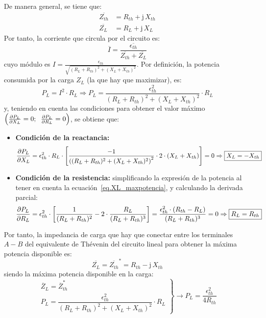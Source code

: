 \documentclass[11pt]{book} %
\begin{document}
De manera general, se tiene que: 
\begin{align*}
  \overline{Z_{th}} &= R_{th} + \mathrm{j}\,X_{th}\\
  \overline{Z_L} &= R_L + \mathrm{j}\,X_L
\end{align*}
Por tanto, la corriente que circula por el circuito es: 
\begin{equation*}
\overline{I} = \frac{\overline{\epsilon_{th}}}{\overline{Z_{th}} + \overline{Z_L}}
\end{equation*}
cuyo módulo es $I=\frac{\epsilon_{th}}{\sqrt{(R_L+R_{th})^2+(X_L+X_{th})^2}}$. Por definición, la potencia consumida por la carga $Z_L$ (la que hay que maximizar), es: 
\begin{equation*}
   P_L= I^2 \cdot R_L\Rightarrow P_L = \dfrac{\epsilon_{th}^2}{{(R_L+R_{th})^2+(X_L+X_{th})^2}} \cdot R_L
\end{equation*}
y, teniendo en cuenta las condiciones para obtener el valor máximo $\left(\diffp{P_L}{X_L} = 0;\;\;    \diffp{P_L}{R_L} = 0\right)$, se obtiene que: 
\begin{itemize}
    \item \textbf{Condición de la reactancia:}
    \begin{equation}\label{eq.XL_maxpotencia}
        \diffp{P_L}{X_L} = \epsilon^2_{th} \cdot R_L \cdot \left[\frac{-1}{\left((R_L + R_{th})^2 + (X_L + X_{th})^2\right)^2} \cdot 2 \cdot (X_L + X_{th})\right]=0\Rightarrow \boxed{X_L = - X_{th}}
    \end{equation}
    \item \textbf{Condición de la resistencia:} simplificando la expresión de la potencia al tener en cuenta la ecuación~\eqref{eq.XL_maxpotencia}, y calculando la derivada parcial: 
    \begin{equation}\label{eq.R_maxpotencia}
        \diffp{P_L}{R_L} = \epsilon^2_{th} \cdot \left[\frac{1}{(R_L + R_{th})^2} - 2 \cdot \frac{R_L}{(R_L + R_{th})^3}\right]= \frac{\epsilon^2_{th} \cdot (R_{th} - R_L)}{(R_L + R_{th})^3}=0\Rightarrow \boxed{R_L = R_{th}}
    \end{equation}
\end{itemize}
Por tanto, la impedancia de carga que hay que conectar entre los terminales $A-B$ del equivalente de Thévenin del circuito lineal para obtener la máxima potencia disponible es:
\begin{equation}
    \boxed{\overline{Z_L} = \overline{Z_{th}}^*=R_{th}-\mathrm{j}\,X_{th}}
\end{equation}
siendo la máxima potencia disponible en la carga:
\begin{equation}
  \left.
    \begin{matrix}
      \overline{Z}_L = \overline{Z}_{th}^*\\
      P_L = \dfrac{\epsilon_{th}^2}{{(R_L+R_{th})^2+(X_L+X_{th})^2}} \cdot R_L
    \end{matrix} \right\}\rightarrow
  \boxed{P_L = \frac{\epsilon^2_{th}}{4 R_{th}}}
\end{equation}
\end{document}
